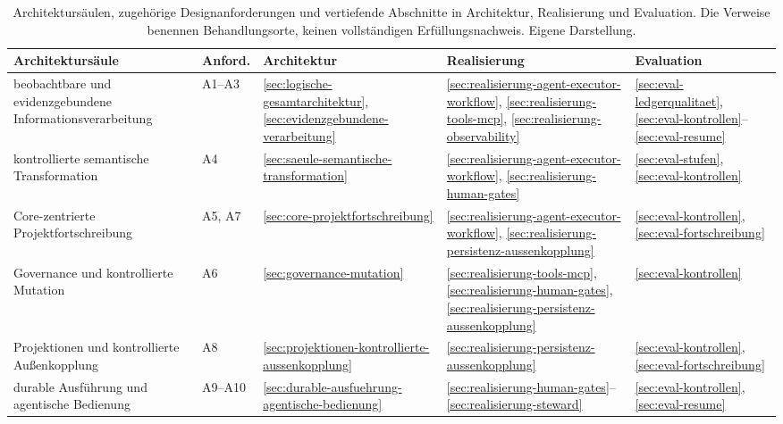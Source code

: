 \begin{table}[!htb]
\centering
\caption[Übergabe der Anforderungen an die Architektursäulen]{
Architektursäulen, zugehörige Designanforderungen und vertiefende
Abschnitte in Architektur, Realisierung und Evaluation.
Die Verweise benennen Behandlungsorte, keinen vollständigen
Erfüllungsnachweis. Eigene Darstellung.}
\label{t:saeulen-uebergabe}
\small
\setlength{\tabcolsep}{3pt}
\renewcommand{\arraystretch}{1.2}
\begin{tabularx}{\textwidth}{
    >{\raggedright\arraybackslash}p{}
    >{\raggedright\arraybackslash}p{}
    >{\raggedright\arraybackslash}X
    >{\raggedright\arraybackslash}X
    >{\raggedright\arraybackslash}X
}
\toprule
\textbf{Architektursäule} & \textbf{Anford.} &
\textbf{Architektur} & \textbf{Realisierung} & \textbf{Evaluation} \\
\midrule
beobachtbare und evidenzgebundene Informationsverarbeitung & A1--A3 &
\ref{sec:logische-gesamtarchitektur},
\ref{sec:evidenzgebundene-verarbeitung} &
\ref{sec:realisierung-agent-executor-workflow},
\ref{sec:realisierung-tools-mcp},
\ref{sec:realisierung-observability} &
\ref{sec:eval-ledgerqualitaet},
\ref{sec:eval-kontrollen}--\ref{sec:eval-resume} \\
\addlinespace[0.5em]
kontrollierte semantische Transformation & A4 &
\ref{sec:saeule-semantische-transformation} &
\ref{sec:realisierung-agent-executor-workflow},
\ref{sec:realisierung-human-gates} &
\ref{sec:eval-stufen}, \ref{sec:eval-kontrollen} \\
\addlinespace[0.5em]
Core-zentrierte Projektfortschreibung & A5, A7 &
\ref{sec:core-projektfortschreibung} &
\ref{sec:realisierung-agent-executor-workflow},
\ref{sec:realisierung-persistenz-aussenkopplung} &
\ref{sec:eval-kontrollen}, \ref{sec:eval-fortschreibung} \\
\addlinespace[0.5em]
Governance und kontrollierte Mutation & A6 &
\ref{sec:governance-mutation} &
\ref{sec:realisierung-tools-mcp},
\ref{sec:realisierung-human-gates},
\ref{sec:realisierung-persistenz-aussenkopplung} &
\ref{sec:eval-kontrollen} \\
\addlinespace[0.5em]
Projektionen und kontrollierte Außenkopplung & A8 &
\ref{sec:projektionen-kontrollierte-aussenkopplung} &
\ref{sec:realisierung-persistenz-aussenkopplung} &
\ref{sec:eval-kontrollen}, \ref{sec:eval-fortschreibung} \\
\addlinespace[0.5em]
durable Ausführung und agentische Bedienung & A9--A10 &
\ref{sec:durable-ausfuehrung-agentische-bedienung} &
\ref{sec:realisierung-human-gates}--\ref{sec:realisierung-steward} &
\ref{sec:eval-kontrollen}, \ref{sec:eval-resume} \\
\bottomrule
\end{tabularx}
\end{table}
